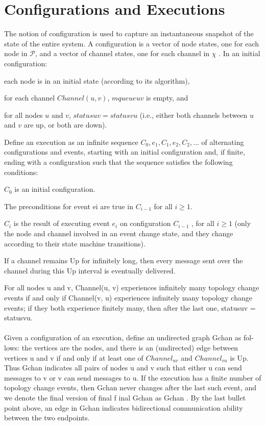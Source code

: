 \section{Configurations and Executions}
The notion of configuration is used to capture an instantaneous snapshot of the state of the entire system. A configuration is a vector of node states, one for each node in $\mathcal{P}$, and a vector of channel states, one for each channel in $\chi$ . In an initial configuration:
\begin{list}{--}{spacing}
	\item each node is in an initial state (according to its algorithm),
	\item for each channel $Channel(u, v)$, $mqueueuv$ is empty, and
	\item for all nodes $u$ and $v$, $statusuv = statusvu$ (i.e., either both channels between $u$ and $v$ are up, or both are down).
\end{list}
Define an execution as an infinite sequence $C_0, e_1 ,C_1, e_2 ,C_2,...$ of alternating configurations and events, starting with an initial configuration and, if finite, ending with a configuration such that the sequence satisfies the following conditions:
\begin{list}{--}{spacing}
\item  $C_0$ is an initial configuration.
\item The preconditions for event ei are true in $C_{i-1}$ for all $i\geq 1$.
\item $C_i$ is the result of executing event $e_i$ on configuration $C_{i-1}$ , for all $i\geq 1$ (only the node and channel involved in an event change state, and they change according to their state machine transitions).
\item If a channel remains Up for infinitely long, then every message sent over the channel during this Up interval is eventually delivered.
\item For all nodes u and v, Channel(u, v) experiences infinitely many topology change events if and only if Channel(v, u) experiences infinitely many topology change events; if they both experience finitely many, then after the last one, statusuv = statusvu.
\end{list}
\paragraph{}Given a configuration of an execution, define an undirected graph Gchan as fol- lows: the vertices are the nodes, and there is an (undirected) edge between vertices u and v if and only if at least one of $Channel_{uv}$ and $Channel_{vu}$ is Up. Thus Gchan indicates all pairs of nodes u and v such that either u can send messages to v or v can send messages to u. If the execution has a finite number of topology change events, then Gchan never changes after the last such event, and we denote the final version of final f inal Gchan as Gchan . By the last bullet point above, an edge in Gchan indicates bidirectional communication ability between the two endpoints.
